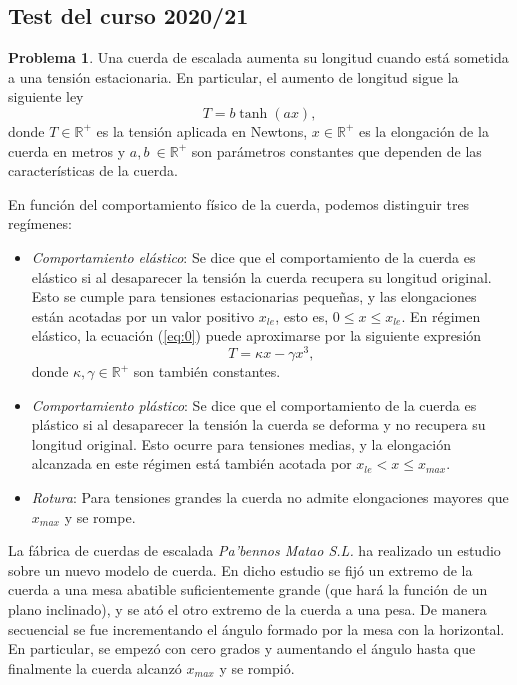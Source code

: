 \begin{paracol}{2}
\section{Test del curso 2020/21}

\noindent \textbf{Problema 1}. Una cuerda de escalada aumenta su longitud cuando está sometida a una tensión estacionaria. En particular, el aumento de longitud sigue la siguiente ley
\begin{equation}\label{eq:0}
T = b\tanh(ax),
\end{equation}
donde $T \in \mathbb{R}^+$ es la tensión aplicada en Newtons, $x \in \mathbb{R}^+$ es la elongación de la cuerda en metros y $a, b \ \in \mathbb{R}^+$ son parámetros constantes que dependen de las características de la cuerda.

En función del comportamiento físico de la cuerda, podemos distinguir tres regímenes:

\begin{itemize}
	\item \emph{Comportamiento elástico}: Se dice que el comportamiento de la cuerda es elástico si al desaparecer la tensión la cuerda recupera su longitud original. Esto se cumple para tensiones estacionarias pequeñas, y las elongaciones están acotadas por un valor positivo $x_{le}$, esto es, $0 \le x \le x_{le}$. En régimen elástico, la ecuación (\ref{eq:0}) puede aproximarse por la siguiente expresión
\begin{equation}\label{eq:1}
T = \kappa x - \gamma x^3,
\end{equation}
donde $\kappa,\gamma \in \mathbb{R}^+$ son también constantes.

\item \emph{Comportamiento plástico}: Se dice que el comportamiento de la cuerda es plástico si al desaparecer la tensión la cuerda se deforma y no recupera su longitud original. Esto ocurre para tensiones medias, y la elongación alcanzada en este régimen está también acotada por $x_{le} < x \le x_{max}$.

\item \emph{Rotura}: Para tensiones grandes la cuerda no admite elongaciones mayores que $x_{max}$ y se rompe.

\end{itemize}

La fábrica de cuerdas de escalada \textit{Pa'bennos Matao S.L.} ha realizado un estudio sobre un nuevo modelo de cuerda. En dicho estudio se fijó un extremo de la cuerda a una mesa abatible suficientemente grande (que hará la función de un plano inclinado), y se ató el otro extremo de la cuerda a una pesa. De manera secuencial se fue incrementando el ángulo formado por la mesa con la horizontal. En particular, se empezó con cero grados y aumentando el ángulo hasta que finalmente la cuerda alcanzó $x_{max}$ y se rompió. 


\end{paracol}
